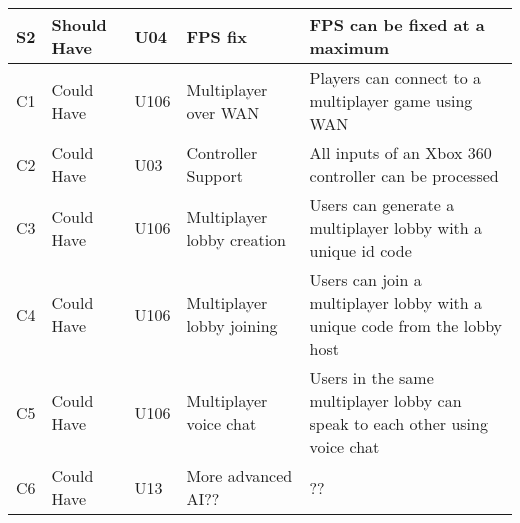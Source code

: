 \documentclass{article} %
\begin{document}
\begin{longtable}{|p{}|p{}|p{}|p{}|p{}|}
    S2                          & Should Have                        & U04                & FPS fix                     & FPS can be fixed at a maximum                                                                                                                               \\ \hline
    C1 & Could Have & U106 & Multiplayer over WAN & Players can connect to a multiplayer game using WAN \\ \hline
    C2 & Could Have & U03 & Controller Support & All inputs of an Xbox 360 controller can be processed \\ \hline
    C3 & Could Have & U106 & Multiplayer lobby creation & Users can generate a multiplayer lobby with a unique id code \\ \hline
    C4 & Could Have & U106 & Multiplayer lobby joining & Users can join a multiplayer lobby with a unique code from the lobby host \\ \hline
    C5 & Could Have & U106 & Multiplayer voice chat & Users in the same multiplayer lobby can speak to each other using voice chat \\ \hline
    C6 & Could Have & U13 & More advanced AI?? & ?? \\ \hline

\end{longtable}
\newpage
\end{document}
